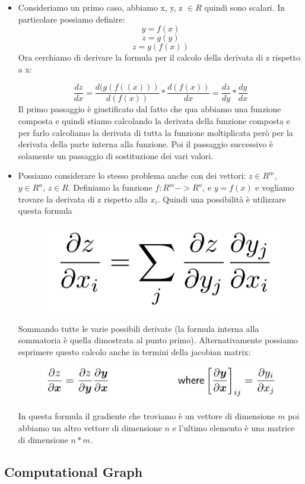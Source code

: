 \documentclass[14pt]{extreport}
\begin{document}
\begin{itemize}
\item Consideriamo un primo caso, abbiamo x, y, z $\in R$ quindi sono scalari. In particolare possiamo definire:
$$y = f(x)$$
$$z = g(y)$$
$$z = g(f(x))$$ Ora cerchiamo di derivare la formula per il calcolo della derivata di z rispetto a x:

$$\frac{dz}{dx}=\frac{d(g(f((x)))}{d(f(x))}*\frac{d(f(x))}{dx} = \frac{dz}{dy}*\frac{dy}{dx}$$ Il primo passaggio è giustificato dal fatto che qua
abbiamo una funzione composta e quindi stiamo calcolando la derivata della funzione composta e per farlo calcoliamo la derivata di tutta la funzione
moltiplicata però per la derivata della parte interna alla funzione. Poi il passaggio successivo è solamente un passaggio di sostituzione dei vari
valori.
\item Possiamo considerare lo stesso problema anche con dei vettori: $z \in R^m$, $y \in R^n$, $z \in R$. Definiamo la funzione $f:R^m -> R^n$, e $y =
f(x)$ e vogliamo trovare la derivata di z rispetto alla $x_i$. Quindi una possibilità è utilizzare questa formula \begin{figure}[H]
\centering
\includegraphics[width=0.7\linewidth]{382.jpeg}
\end{figure}
Sommando tutte le varie possibili derivate (la formula interna alla sommatoria è quella dimostrata al punto primo). Alternativamente possiamo
esprimere questo calcolo anche in termini della jacobian matrix:
\begin{figure}[H]
\centering
\includegraphics[width=0.7\linewidth]{383.jpeg}
\end{figure}
In questa formula il gradiente che troviamo è un vettore di dimensione $m$ poi abbiamo un altro vettore di dimensione $n$ e l'ultimo elemento è una
matrice di dimensione $n*m$.
\end{itemize}


\subsection{Computational Graph}
\end{document}
